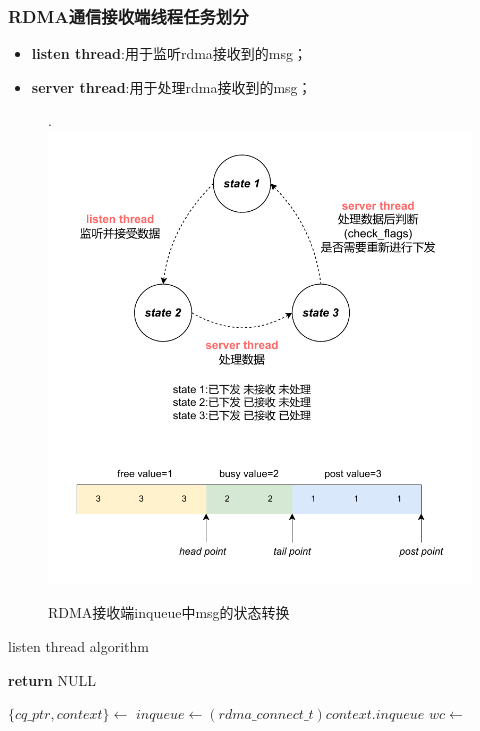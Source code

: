{\subsubsection{RDMA通信接收端线程任务划分}

\begin{itemize}[leftmargin=*, nosep]
    \item \textbf{listen thread}:用于监听rdma接收到的msg；
    \item \textbf{server thread}:用于处理rdma接收到的msg；
\end{itemize}

\begin{figure}[H]
    \centering
.    \includegraphics[width=1.0\textwidth]{Img/recv_state.drawio.pdf}
    \caption{RDMA接收端inqueue中msg的状态转换}
\end{figure}
        
\begin{algorithm}
    \caption{listen thread algorithm}
    \begin{algorithmic}[1] %
            \State {}
            \State \textbf{return} NULL
        \EndProcedure

                \State $\{ cq\_ptr, context\} \gets$  
                \State $inqueue \gets (rdma\_connect\_t)context.inqueue$
                \State {}
                \State $wc \gets$ 


\end{algorithmic}
\end{algorithm}}
